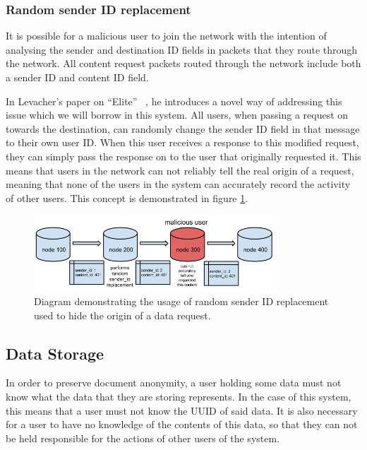 \subsubsection{Random sender ID replacement}


It is possible for a malicious user to join the network with the intention of analysing the
sender and destination ID fields in packets that they route through the network. All content request
packets routed through the network include both a sender ID and content ID field.

In Levacher's paper on ``Elite'' ~\cite{levacher}, he introduces a novel way of addressing this issue which we will borrow
in this system.
All users, when passing a request on towards the destination, can randomly change the sender ID field in that message
to their own user ID. When this user receives a response to this modified request, they can simply pass the response
on to the user that originally requested it. This means that users in the network can not reliably tell
the real origin of a request, meaning that none of the users in the system can accurately record the activity of other users.
This concept is demonstrated in figure \ref{fig:sender_id}.

\begin{figure}[H]
    \centering
    \includegraphics[width=0.8\textwidth]{img/sender_id.png}
    \caption{Diagram demonstrating the usage of random sender ID replacement used to hide the origin of a data request.}
    \label{fig:sender_id}
\end{figure}


\subsection{Data Storage}


In order to preserve document anonymity, a user holding some data must not know what the data that they are storing represents.
In the case of this system, this means that a user must not know the UUID of said data.
It is also necessary for a user to have no knowledge of the contents of this data, so that they can not be held
responsible for the actions of other users of the system.

